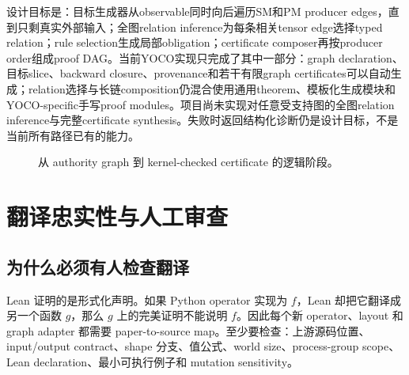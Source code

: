 \documentclass[10.5pt,a4paper]{ctexart}
\begin{document}
设计目标是：目标生成器从observable同时向后遍历SM和PM producer edges，直到只剩真实外部输入；全图relation inference为每条相关tensor edge选择typed relation；rule selection生成局部obligation；certificate composer再按producer order组成proof DAG。当前YOCO实现只完成了其中一部分：graph declaration、目标slice、backward closure、provenance和若干有限graph certificates可以自动生成；relation选择与长链composition仍混合使用通用theorem、模板化生成模块和YOCO-specific手写proof modules。项目尚未实现对任意受支持图的全图relation inference与完整certificate synthesis。失败时返回结构化诊断仍是设计目标，不是当前所有路径已有的能力。

\begin{figure}[h]
\centering
{}
\caption{从 authority graph 到 kernel-checked certificate 的逻辑阶段。}
\label{fig:proofpipe}
\end{figure}

\section{翻译忠实性与人工审查}

\subsection{为什么必须有人检查翻译}

Lean 证明的是形式化声明。如果 Python operator 实现为 $f$，Lean 却把它翻译成另一个函数 $g$，那么 $g$ 上的完美证明不能说明 $f$。因此每个新 operator、layout 和 graph adapter 都需要 paper-to-source map。至少要检查：上游源码位置、input/output contract、shape 分支、值公式、world size、process-group scope、Lean declaration、最小可执行例子和 mutation sensitivity。
\end{document}
